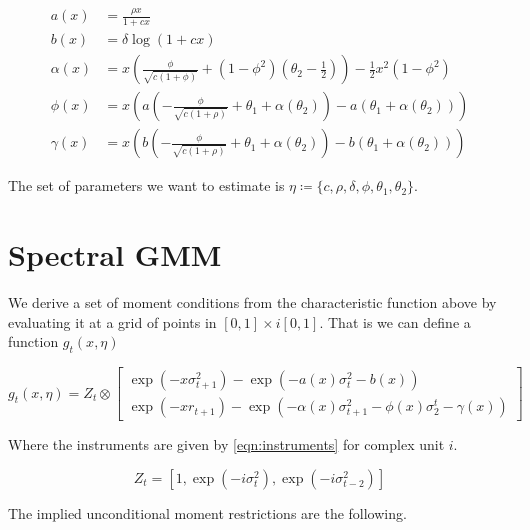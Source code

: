 \documentclass[11pt]{article}
\begin{document}
\begin{align}
    a(x) &= \frac{\rho x}{1 + c x} \\ \label{eqn:a(x)}
    b(x) &= \delta \log \left(1 + c x\right) \\ \label{eqn:b(x)}
    \alpha(x) &= x \left(\frac{\phi}{\sqrt{c (1 + \phi)}}  + (1 - \phi^2)\left(\theta_2 - \frac{1}{2}\right)\right)
    - \frac{1}{2} x^2 (1 - \phi^2) \\ \label{eqn:alpha(x)}
    \phi(x)  &= x \left(a\left(-\frac{\phi}{\sqrt{c(1+ \rho)}} + \theta_1 + \alpha(\theta_2)\right) -
        a\left(\theta_1 + \alpha(\theta_2)\right)\right) \\ \label{eqn:beta(x)}
    \gamma(x) &= x \left(b\left(-\frac{\phi}{\sqrt{c(1+\rho)}} + \theta_1 + \alpha(\theta_2)\right) -
        b\left(\theta_1 + \alpha(\theta_2)\right) \right)
\end{align}


The set of parameters we want to estimate is $\eta \coloneqq \lbrace c, \rho, \delta, \phi, \theta_1,
\theta_2\rbrace$.

\section{Spectral GMM}
\label{sec:spectral_GMM}

We derive a set of moment conditions from the characteristic function above by evaluating it at a grid of points
in $[0,1] \times i [0,1]$. 
That is we can define a function $g_t(x, \eta)$

\begin{equation}
g_t(x, \eta) = Z_t \otimes \begin{bmatrix} \exp(- x \sigma^2_{t+1}) - \exp\left( - a(x) \sigma_t^2 - b(x)
    \right) \\ \exp\left(- x r_{t+1}\right) - \exp\left(- \alpha(x) \sigma^2_{t+1} - \phi(x) \sigma_2^t -
    \gamma(x)\right) \end{bmatrix}
\end{equation}

Where the instruments are given by \cref{eqn:instruments} for complex unit $i$. 

\begin{equation}
    \label{eqn:instruments}
    Z_t = \left[1, \exp\left(- i \sigma_t^2\right), \exp\left(-i \sigma^2_{t-2}\right)\right] 
\end{equation}

The implied unconditional moment restrictions are the following.  
\end{document}
